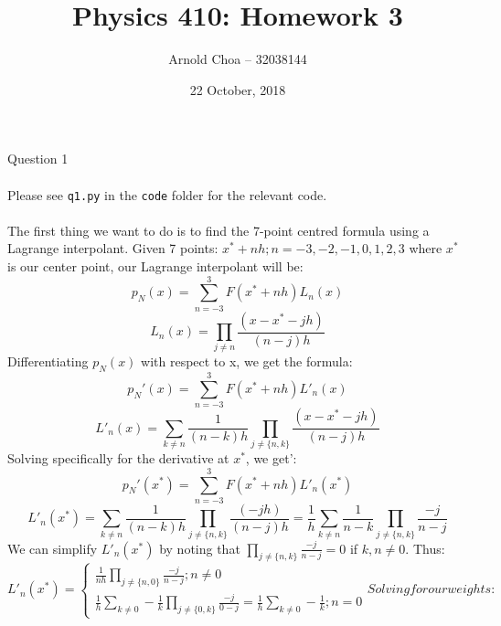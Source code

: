 \documentclass[10pt]{article} %
\title{Physics 410: Homework 3}
\author{Arnold Choa -- 32038144}
\date{22 October, 2018} %
\begin{document}
\maketitle
\vspace{-0.5cm}
\noindent \Large{Question 1}
\\ \\
\normalsize{Please see \texttt{q1.py} in the \texttt{code} folder for the relevant code.}
\\ \\
\normalsize{The first thing we want to do is to find the 7-point centred formula using a Lagrange interpolant. Given 7 points: $x^* + nh; n=-3,-2,-1,0,1,2,3$} where $x^*$ is our center point, our Lagrange interpolant will be:
\begin{equation}
	p_N(x) = \sum_{n=-3}^{3}F(x^* + nh)L_n(x)
\end{equation}
\begin{equation}
	L_n(x) = \prod_{j \neq n}\frac{(x - x^* - jh)}{(n-j)h}
\end{equation}
Differentiating $p_N(x)$ with respect to x, we get the formula:
\begin{equation}
	p_N'(x) = \sum_{n=-3}^{3}F(x^* + nh)L'_n(x)
\end{equation}
\begin{equation}
	L'_n(x) = \sum_{k \neq  n}\frac{1}{(n-k)h}\prod_{j \neq \{n,k\}}\frac{(x - x^* - jh)}{(n-j)h}
\end{equation}
Solving specifically for the derivative at $x^*$, we get':
\begin{equation}
	p_N'(x^*) = \sum_{n=-3}^{3}F(x^* + nh)L'_n(x^*)
\end{equation}
\begin{equation}
	L'_n(x^*) = \sum_{k \neq  n}\frac{1}{(n-k)h}\prod_{j \neq \{n,k\}}\frac{(- jh)}{(n-j)h} = \frac{1}{h} \sum_{k \neq  n}\frac{1}{n-k}\prod_{j \neq \{n,k\}}\frac{- j}{n-j}
\end{equation}
We can simplify $L'_n(x^*)$ by noting that $\prod_{j \neq \{n,k\}}\frac{- j}{n-j} = 0$ if $k,n \neq 0$. Thus:
\begin{equation}
	L'_n(x^*) =
	\begin{cases}
		\frac{1}{nh} \prod_{j \neq \{n,0\}}\frac{- j}{n-j}; n \neq 0 \\
		\frac{1}{h} \sum_{k \neq  0} -\frac{1}{k}\prod_{j \neq \{0,k\}}\frac{- j}{0-j} =\frac{1}{h} \sum_{k \neq  0} -\frac{1}{k} ; n=0
	\end{cases}
Solving for our weights:
\end{equation}
\end{document}
